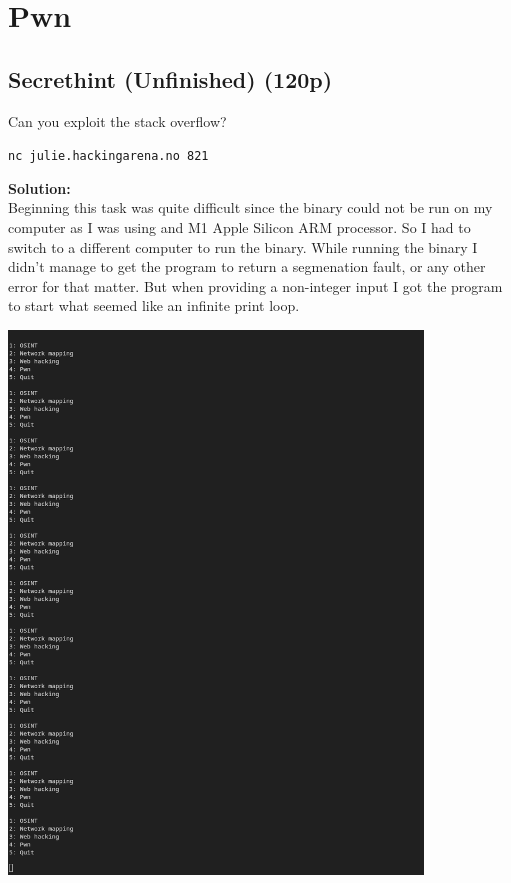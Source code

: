 \section{Pwn}

\subsection{Secrethint (Unfinished) (120p)}
\addtocounter{unfinished}{120}

Can you exploit the stack overflow?

\texttt{nc julie.hackingarena.no 821}

\textbf{Solution:}\\
Beginning this task was quite difficult since the binary could not be run on my computer as I was using and M1 Apple Silicon ARM processor.
So I had to switch to a different computer to run the binary.
While running the binary I didn't manage to get the program to return a segmenation fault, or any other error for that matter. But when providing a non-integer input I got the program to start what seemed like an infinite print loop.

\begin{center}
    \includegraphics[width=11cm]{img/Pwn/Screenshot from 2023-11-24 23-39-39.png}
\end{center}